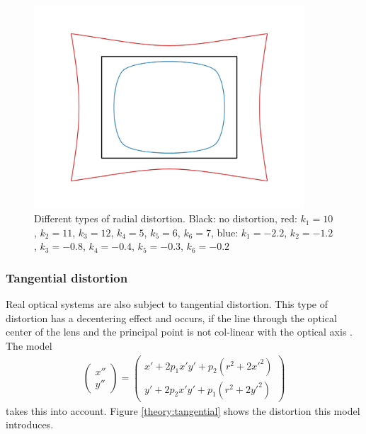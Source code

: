 \begin{figure}[ht]
	\centering
	\includegraphics[width=0.9\textwidth]{2-theory/calibration/distortion/radial.png}
	\caption{Different types of radial distortion. Black: no distortion, red: $k_1 = 10$, $k_2=11$, $k_3=12$, $k_4=5$, $k_5=6$, $k_6=7$, blue: $k_1 = -2.2$, $k_2=-1.2$, $k_3=-0.8$, $k_4=-0.4$, $k_5=-0.3$, $k_6=-0.2$\label{theory:radial}}
\end{figure} 

\subsubsection{Tangential distortion}
Real optical systems are also subject to tangential distortion. This type of distortion has a decentering effect and occurs, if the line through the optical center of the lens and the principal point is not col-linear with the optical axis \cite{weng}.
The model
\begin{align}
\begin{pmatrix}
x''\\
y''
\end{pmatrix}=
\begin{pmatrix}
x' + 2p_1x'y'+p_2(r^2+2x'^2)\\
y' + 2p_2x'y'+p_1(r^2+2y'^2)
\end{pmatrix}\label{theory:tandist}
\end{align}
takes this into account.
Figure \ref{theory:tangential} shows the distortion this model introduces.

